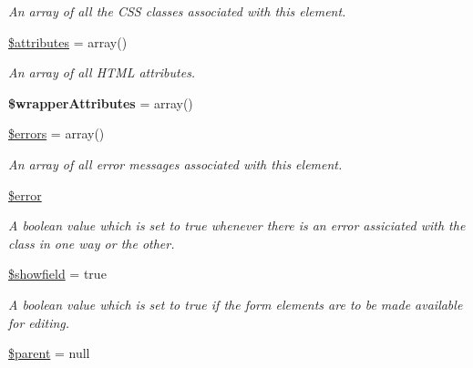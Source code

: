 \begin{DoxyCompactItemize}
\begin{DoxyCompactList}\small\item\em An array of all the CSS classes associated with this element. \item\end{DoxyCompactList}\item 
\hyperlink{class_element_a87721c1651e32caa27a535990691b042}{\$attributes} = array()
\begin{DoxyCompactList}\small\item\em An array of all HTML attributes. \item\end{DoxyCompactList}\item 
\hypertarget{class_element_af76e9e9269c3b9037b9798de575e1550}{
{\bfseries \$wrapperAttributes} = array()}
\label{class_element_af76e9e9269c3b9037b9798de575e1550}

\item 
\hyperlink{class_element_ab75315206e498260e432db06b92d847d}{\$errors} = array()
\begin{DoxyCompactList}\small\item\em An array of all error messages associated with this element. \item\end{DoxyCompactList}\item 
\hyperlink{class_element_a32cd1c7684f9ffd01cfba1ebd7171f47}{\$error}
\begin{DoxyCompactList}\small\item\em A boolean value which is set to true whenever there is an error assiciated with the class in one way or the other. \item\end{DoxyCompactList}\item 
\hyperlink{class_element_a3c4fefc5dff30cf45b053266bb07efdf}{\$showfield} = true
\begin{DoxyCompactList}\small\item\em A boolean value which is set to true if the form elements are to be made available for editing. \item\end{DoxyCompactList}\item 
\hypertarget{class_element_a12d087935128c8e4691c895df5e656bf}{
\hyperlink{class_element_a12d087935128c8e4691c895df5e656bf}{\$parent} = null}
\label{class_element_a12d087935128c8e4691c895df5e656bf}


\end{DoxyCompactItemize}
